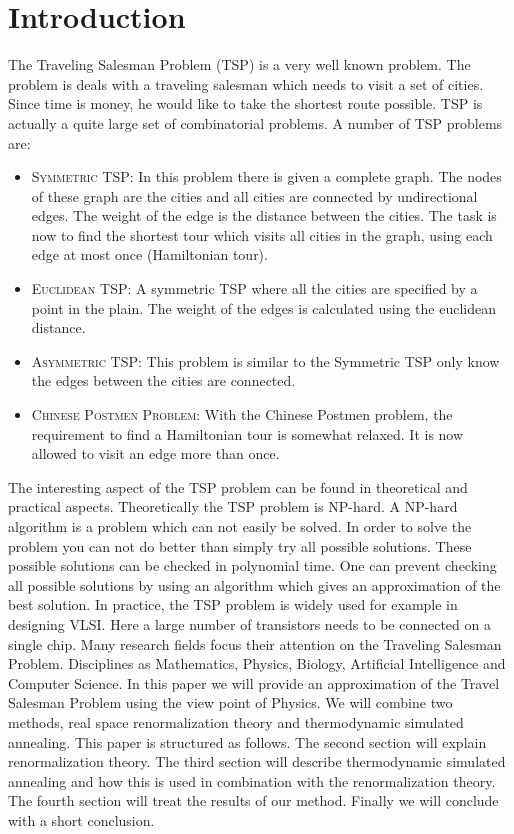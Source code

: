 \section{Introduction}
The Traveling Salesman Problem (TSP) is a very well known problem. The problem is deals with a traveling salesman which needs to visit a set of cities. Since time is money, he would like to take the shortest route possible. TSP is actually a quite large set of combinatorial problems. A number of TSP problems are:
\begin{itemize}
\item \textsc{Symmetric TSP:}  In this problem there is given a complete graph. The nodes of these graph are the cities and all cities are connected by undirectional edges. The weight of the edge is the distance between the cities. The task is now to find the shortest tour which visits all cities in the graph, using each edge at most once (Hamiltonian tour).
\item \textsc{Euclidean TSP:}  A symmetric TSP where all the cities are specified by a point in the plain. The weight of the edges is calculated using the euclidean distance.
\item \textsc{Asymmetric TSP:} This problem is similar to the Symmetric TSP only know the edges between the cities are connected.
\item \textsc{Chinese Postmen Problem:} With the Chinese Postmen problem,  the requirement to find a Hamiltonian tour is somewhat relaxed. It is now allowed to visit an edge more than once.
\end{itemize}
The interesting aspect of the TSP problem can be found in theoretical and practical aspects. Theoretically the TSP problem is NP-hard. A NP-hard algorithm is a problem which can not easily be solved. In order to solve the problem you can not do better than simply try all possible solutions. These possible solutions can be checked in polynomial time.  One can prevent checking all possible solutions by using an algorithm which gives an approximation of the best solution.
In practice, the TSP problem is widely used for example in designing  VLSI. Here a large number of transistors needs to be connected on a single chip.
\newline\newline\noindent
Many research fields focus their attention on the Traveling Salesman Problem. Disciplines as Mathematics, Physics, Biology, Artificial Intelligence and Computer Science. In this paper we will provide an approximation of the Travel Salesman Problem using the view point of Physics. We will combine two methods, real space renormalization theory and thermodynamic simulated annealing. This paper is structured as follows. The second section will explain renormalization theory. The third section will describe thermodynamic simulated annealing and how this is used in combination with the renormalization theory. The fourth section will treat the results of our method. Finally we will conclude with a short conclusion.



